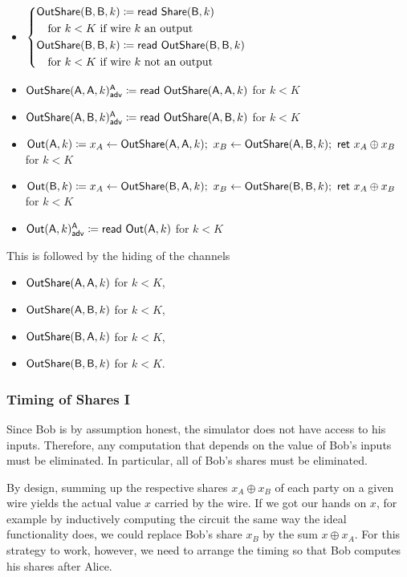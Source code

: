 \begin{itemize}
\item $\begin{cases*} \OutShare(\B,\B,k) \coloneqq \read{\Share(\B,k)} \\ \hspace{10pt} \text{for $k < K$ if wire $k$ an output} \\ \OutShare(\B,\B,k) \coloneqq \read{\OutShare(\B,\B,k)} \\ \hspace{10pt} \text{for $k < K$ if wire $k$ not an output} \end{cases*}$
\item {\color{blue} $\mathsf{OutShare}(\mathsf{A},\mathsf{A},k)^{\mathsf{A}}_{\mathsf{adv}} \coloneqq \mathsf{read} \ \mathsf{OutShare}(\mathsf{A},\mathsf{A},k)$ for $k < K$}
\item {\color{blue} $\mathsf{OutShare}(\mathsf{A},\mathsf{B},k)^{\mathsf{A}}_{\mathsf{adv}} \coloneqq \mathsf{read} \ \mathsf{OutShare}(\mathsf{A},\mathsf{B},k)$ for $k < K$}
\item $\mathsf{Out}(\mathsf{A},k) \coloneqq x_A \leftarrow \mathsf{OutShare}(\mathsf{A},\mathsf{A},k); \ x_B \leftarrow \mathsf{OutShare}(\mathsf{A},\mathsf{B},k); \ \mathsf{ret} \ x_A \oplus x_B$ for $k < K$
\item $\mathsf{Out}(\mathsf{B},k) \coloneqq x_A \leftarrow \mathsf{OutShare}(\mathsf{B},\mathsf{A},k); \ x_B \leftarrow \mathsf{OutShare}(\mathsf{B},\mathsf{B},k); \ \mathsf{ret} \ x_A \oplus x_B$ for $k < K$
\item {\color{blue} $\mathsf{Out}(\mathsf{A},k)^{\mathsf{A}}_{\mathsf{adv}} \coloneqq \mathsf{read} \ \mathsf{Out}(\mathsf{A},k)$ for $k < K$}
\end{itemize}
This is followed by the hiding of the channels
\begin{itemize}
\item $\mathsf{OutShare}(\mathsf{A},\mathsf{A},k)$ for $k < K$,
\item $\mathsf{OutShare}(\mathsf{A},\mathsf{B},k)$ for $k < K$,
\item $\mathsf{OutShare}(\mathsf{B},\mathsf{A},k)$ for $k < K$,
\item $\mathsf{OutShare}(\mathsf{B},\mathsf{B},k)$ for $k < K$.
\end{itemize}

\subsubsection{Timing of Shares I}\label{sect:gmw_timing_1}
Since Bob is by assumption honest, the simulator does not have access to his inputs. Therefore, any computation that depends on the value of Bob's inputs must be eliminated. In particular, all of Bob's shares must be eliminated.

By design, summing up the respective shares $x_A \oplus x_B$ of each party on a given wire yields the actual value $x$ carried by the wire. If we got our hands on $x$, for example by inductively computing the circuit the same way the ideal functionality does, we could replace Bob's share $x_B$ by the sum $x \oplus x_A$. For this strategy to work, however, we need to arrange the timing so that Bob computes his shares after Alice.\medskip

